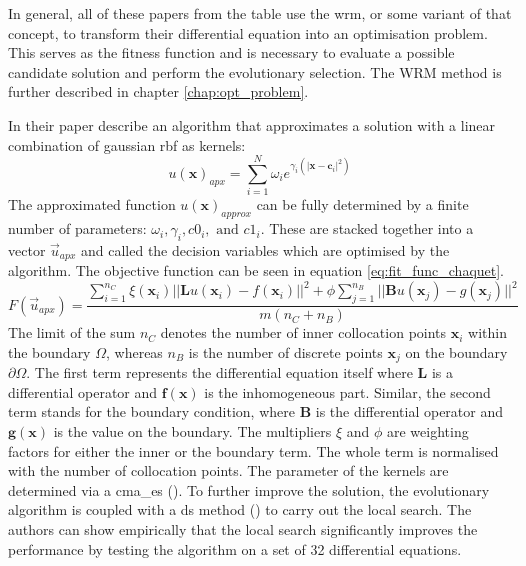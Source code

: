 \documentclass[./\jobname.tex,hidelinks]{subfiles}
\begin{document}
In general, all of these papers from the table use the \gls{wrm}, or some variant of that concept, to transform their differential equation into an optimisation problem. This serves as the fitness function and is necessary to evaluate a possible candidate solution and perform the evolutionary selection. The WRM method is further described in chapter \ref{chap:opt_problem}.

In their paper \cite{chaquet_using_2019} describe an algorithm that approximates a solution with a linear combination of gaussian \gls{rbf} as kernels:
\begin{equation}
	u(\mathbf{x})_{apx} = \sum_{i=1}^{N} \omega_i e^{\gamma_i (\left|\mathbf{x} - \mathbf{c}_i\right|^2)}
\end{equation}
The approximated function $u(\mathbf{x})_{approx}$ can be fully determined by a finite number of parameters: $\omega_i, \gamma_i, c0_i, \text{ and } c1_i$. These are stacked together into a vector $\vec{u}_{apx}$ and called the decision variables which are optimised by the algorithm. 
The objective function can be seen in equation \ref{eq:fit_func_chaquet}. 
\begin{equation}
\label{eq:fit_func_chaquet}
F(\vec{u}_{apx}) = \frac{\sum_{i=1}^{n_C} \xi (\mathbf{x}_i) || \mathbf{L}u(\mathbf{x}_i) - f(\mathbf{x}_i)||^2 + \phi \sum_{j=1}^{n_B} || \mathbf{B}u(\mathbf{x}_j) - g(\mathbf{x}_j)||^2}{m (n_C + n_B)}  
\end{equation}
The limit of the sum $n_C$ denotes the number of inner collocation points $\mathbf{x}_i$ within the boundary $\Omega$, whereas $n_B$ is the number of discrete points $\mathbf{x}_j$ on the boundary $\partial \Omega$. The first term represents the differential equation itself where $\mathbf{L}$ is a differential operator and $\mathbf{f}(\mathbf{x})$ is the inhomogeneous part. Similar, the second term stands for the boundary condition, where $\mathbf{B}$ is the differential operator and $\mathbf{g}(\mathbf{x})$ is the value on the boundary. The multipliers $\xi$ and $\phi$ are weighting factors for either the inner or the boundary term. The whole term is normalised with the number of collocation points. 
The parameter of the kernels are determined via a \gls{cma_es} (\cite{hansen_cma_2006}). To further improve the solution, the evolutionary algorithm is coupled with a \gls{ds} method (\cite{nelder_simplex_1965}) to carry out the local search. The authors can show empirically that the local search significantly improves the performance by testing the algorithm on a set of 32 differential equations. 
\end{document}
